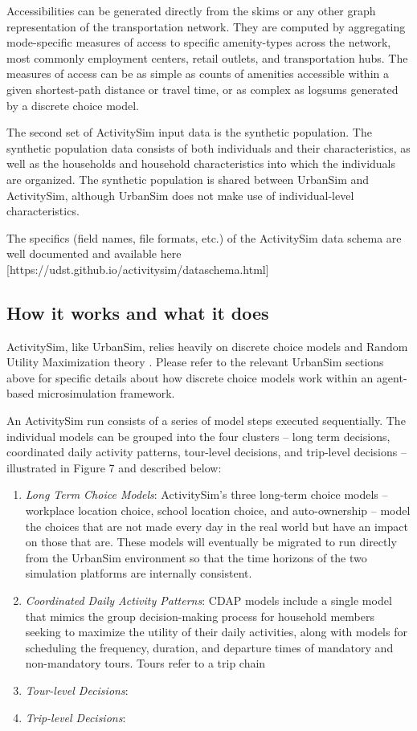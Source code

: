 Accessibilities can be generated directly from the skims or any other graph representation of the transportation network. They are computed by aggregating mode-specific measures of access to specific amenity-types across the network, most commonly employment centers, retail outlets, and transportation hubs. The measures of access can be as simple as counts of amenities accessible within a given shortest-path distance or travel time, or as complex as logsums generated by a discrete choice model. 

The second set of ActivitySim input data is the synthetic population. The synthetic population data consists of both individuals and their characteristics, as well as the households and household characteristics into which the individuals are organized. The synthetic population is shared between UrbanSim and ActivitySim, although UrbanSim does not make use of individual-level characteristics. 

The specifics (field names, file formats, etc.) of the ActivitySim data schema are well documented and available here [https://udst.github.io/activitysim/dataschema.html]

\subsection{How it works and what it does}

ActivitySim, like UrbanSim, relies heavily on discrete choice models and Random Utility Maximization theory \citep{mcfadden-1974}. Please refer to the relevant UrbanSim sections above for specific details about how discrete choice models work within an agent-based microsimulation framework.

An ActivitySim run consists of a series of model steps executed sequentially. The individual models can be grouped into the four clusters -- long term decisions, coordinated daily activity patterns, tour-level decisions, and trip-level decisions -- illustrated in Figure 7 and described below:
\begin{enumerate}[label=(\roman*)]
    \item \textit{Long Term Choice Models}: ActivitySim's three long-term choice models -- workplace location choice, school location choice, and auto-ownership -- model the choices that are not made every day in the real world but have an impact on those that are. These models will eventually be migrated to run directly from the UrbanSim environment so that the time horizons of the two simulation platforms are internally consistent.
    \item \textit{Coordinated Daily Activity Patterns}: CDAP models include a single model that mimics the group decision-making process for household members seeking to maximize the utility of their daily activities, along with models for scheduling the frequency, duration, and departure times of mandatory and non-mandatory tours. Tours refer to a trip chain
    \item \textit{Tour-level Decisions}:
    \item \textit{Trip-level Decisions}:
\end{enumerate}

